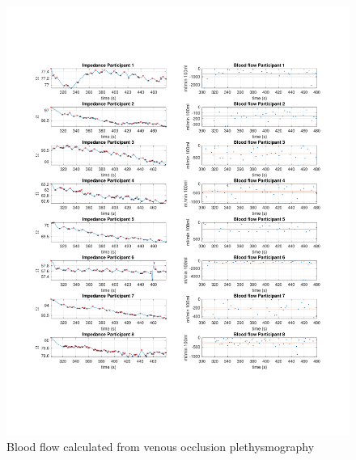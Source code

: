 \begin{figure}
	\includegraphics[width=\textwidth,height=\textheight,keepaspectratio,trim={0.5cm 0.5cm 2cm 2cm},clip]{figure4}    
	\caption{Blood flow calculated from venous occlusion plethysmography}
	\label{fig:blood_flow:venous_occlusion}
\end{figure}


